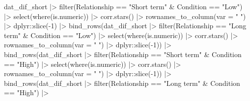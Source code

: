 \documentclass[
  bookmarksnumbered]{article}
\newenvironment{Shaded}{\begin{snugshade}}{\end{snugshade}}
\newcommand{\AttributeTok}[1]{\textcolor[rgb]{0.80,0.80,0.80}{#1}}
\newcommand{\DecValTok}[1]{\textcolor[rgb]{0.86,0.86,0.80}{#1}}
\newcommand{\FunctionTok}[1]{\textcolor[rgb]{0.94,0.94,0.56}{#1}}
\newcommand{\NormalTok}[1]{\textcolor[rgb]{0.80,0.80,0.80}{#1}}
\newcommand{\SpecialCharTok}[1]{\textcolor[rgb]{0.86,0.64,0.64}{#1}}
\newcommand{\StringTok}[1]{\textcolor[rgb]{0.80,0.58,0.58}{#1}}
\begin{document}
\begin{Shaded}
\begin{Highlighting}[]
\NormalTok{dat\_dif\_short }\SpecialCharTok{|\textgreater{}} 
  \FunctionTok{filter}\NormalTok{(Relationship }\SpecialCharTok{==} \StringTok{"Short term"} \SpecialCharTok{\&}\NormalTok{ Condition }\SpecialCharTok{==} \StringTok{"Low"}\NormalTok{) }\SpecialCharTok{|\textgreater{}} 
  \FunctionTok{select}\NormalTok{(}\FunctionTok{where}\NormalTok{(is.numeric)) }\SpecialCharTok{|\textgreater{}} 
  \FunctionTok{corr.stars}\NormalTok{() }\SpecialCharTok{|\textgreater{}}
  \FunctionTok{rownames\_to\_column}\NormalTok{(}\AttributeTok{var =} \StringTok{" "}\NormalTok{) }\SpecialCharTok{|\textgreater{}} 
\NormalTok{  dplyr}\SpecialCharTok{::}\FunctionTok{slice}\NormalTok{(}\SpecialCharTok{{-}}\DecValTok{1}\NormalTok{) }\SpecialCharTok{|\textgreater{}} 
  \FunctionTok{bind\_rows}\NormalTok{(dat\_dif\_short }\SpecialCharTok{|\textgreater{}}
              \FunctionTok{filter}\NormalTok{(Relationship }\SpecialCharTok{==} \StringTok{"Long term"} \SpecialCharTok{\&}\NormalTok{ Condition }\SpecialCharTok{==} \StringTok{"Low"}\NormalTok{) }\SpecialCharTok{|\textgreater{}}
              \FunctionTok{select}\NormalTok{(}\FunctionTok{where}\NormalTok{(is.numeric)) }\SpecialCharTok{|\textgreater{}} 
              \FunctionTok{corr.stars}\NormalTok{() }\SpecialCharTok{|\textgreater{}}
              \FunctionTok{rownames\_to\_column}\NormalTok{(}\AttributeTok{var =} \StringTok{" "}\NormalTok{) }\SpecialCharTok{|\textgreater{}} 
\NormalTok{              dplyr}\SpecialCharTok{::}\FunctionTok{slice}\NormalTok{(}\SpecialCharTok{{-}}\DecValTok{1}\NormalTok{)) }\SpecialCharTok{|\textgreater{}} 
  \FunctionTok{bind\_rows}\NormalTok{(dat\_dif\_short }\SpecialCharTok{|\textgreater{}} 
              \FunctionTok{filter}\NormalTok{(Relationship }\SpecialCharTok{==} \StringTok{"Short term"} \SpecialCharTok{\&}\NormalTok{ Condition }\SpecialCharTok{==} \StringTok{"High"}\NormalTok{) }\SpecialCharTok{|\textgreater{}} 
              \FunctionTok{select}\NormalTok{(}\FunctionTok{where}\NormalTok{(is.numeric)) }\SpecialCharTok{|\textgreater{}} 
              \FunctionTok{corr.stars}\NormalTok{() }\SpecialCharTok{|\textgreater{}}
              \FunctionTok{rownames\_to\_column}\NormalTok{(}\AttributeTok{var =} \StringTok{" "}\NormalTok{) }\SpecialCharTok{|\textgreater{}} 
\NormalTok{              dplyr}\SpecialCharTok{::}\FunctionTok{slice}\NormalTok{(}\SpecialCharTok{{-}}\DecValTok{1}\NormalTok{)) }\SpecialCharTok{|\textgreater{}} 
  \FunctionTok{bind\_rows}\NormalTok{(dat\_dif\_short }\SpecialCharTok{|\textgreater{}}
              \FunctionTok{filter}\NormalTok{(Relationship }\SpecialCharTok{==} \StringTok{"Long term"} \SpecialCharTok{\&}\NormalTok{ Condition }\SpecialCharTok{==} \StringTok{"High"}\NormalTok{) }\SpecialCharTok{|\textgreater{}}

\end{Highlighting}
\end{Shaded}
\end{document}
